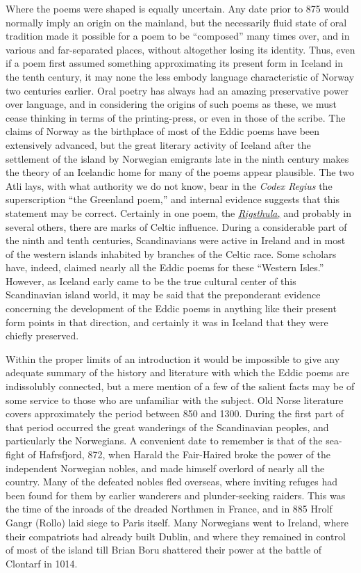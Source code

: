 \documentclass{scrbook}
\newcommand{\chapterref}[1]{\hyperref[cha:#1]{\emph{#1}}}
\begin{document}
Where the poems were shaped is equally uncertain. Any date prior to 875 would normally imply an origin on the mainland, but the necessarily fluid state of oral tradition made it possible for a poem to be ``composed'' many times over, and in various and far-separated places, without altogether losing its identity. Thus, even if a poem first assumed something approximating its present form in Iceland in the tenth century, it may none the less embody language characteristic of Norway two centuries earlier. Oral poetry has always had an amazing preservative power over language, and in considering the origins of such poems as these, we must cease thinking in terms of the printing-press, or even in those of the scribe. The claims of Norway as the birthplace of most of the Eddic poems have been extensively advanced, but the great literary activity of Iceland after the settlement of the island by Norwegian emigrants late in the ninth century makes the theory of an Icelandic home for many of the poems appear plausible. The two Atli lays, with what authority we do not know, bear in the \emph{Codex Regius} the superscription ``the Greenland poem,'' and internal evidence suggests that this statement may be correct. Certainly in one poem, the \chapterref{Rigsthula,} and probably in several others, there are marks of Celtic influence. During a considerable part of the ninth and tenth centuries, Scandinavians were active in Ireland and in most of the western islands inhabited by branches of the Celtic race. Some scholars have, indeed, claimed nearly all the Eddic poems for these ``Western Isles.'' However, as Iceland early came to be the true cultural center of this Scandinavian island world, it may be said that the preponderant evidence concerning the development of the Eddic poems in anything like their present form points in that direction, and certainly it was in Iceland that they were chiefly preserved.


Within the proper limits of an introduction it would be impossible to give any adequate summary of the history and literature with which the Eddic poems are indissolubly connected, but a mere mention of a few of the salient facts may be of some service to those who are unfamiliar with the subject. Old Norse literature covers approximately the period between 850 and 1300. During the first part of that period occurred the great wanderings of the Scandinavian peoples, and particularly the Norwegians. A convenient date to remember is that of the sea-fight of Hafrsfjord, 872, when Harald the Fair-Haired broke the power of the independent Norwegian nobles, and made himself overlord of nearly all the country. Many of the defeated nobles fled overseas, where inviting refuges had been found for them by earlier wanderers and plunder-seeking raiders. This was the time of the inroads of the dreaded Northmen in France, and in 885 Hrolf Gangr (Rollo) laid siege to Paris itself. Many Norwegians went to Ireland, where their compatriots had already built Dublin, and where they remained in control of most of the island till Brian Boru shattered their power at the battle of Clontarf in 1014.
\end{document}
